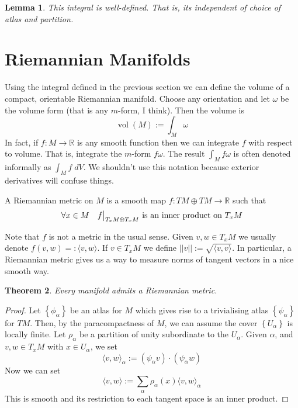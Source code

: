 \documentclass[11pt]{article}
\newcommand{\defeq}{:=}
\newcommand{\eqdef}{=:}
\newcommand{\norm}[1]{||#1||}
\DeclareMathOperator{\vol}{\mathrm{vol}}
\newcommand\restr[2]{{%
  \left.\kern-\nulldelimiterspace %
  #1 %
  \vphantom{\big|} %
  \right|_{#2} %
  }}
\newcommand{\R}{\mathbb{R}}
\newenvironment{defin}
	{\begin{mdframed}[backgroundcolor=white, roundcorner=5pt, linewidth=1pt, linecolor=RoyalBlue]
		\setlength{\parindent}{0pt}}
	{\end{mdframed}}
\newcommand{\mdf}[1]{{\color{RoyalBlue} #1}}
\newtheorem{theorem}{Theorem}[section]
\newtheorem{lemma}[theorem]{Lemma}
\begin{document}
\begin{lemma}
This integral is well-defined.
That is, its independent of choice of atlas and partition.
\end{lemma}

\section{Riemannian Manifolds}
Using the integral defined in the previous section we can define the volume of a compact, orientable Riemannian manifold.
Choose any orientation and let $\omega$ be the volume form (that is any $m$-form, I think).
Then the volume is
\[
	\vol(M)\defeq\int_M \omega
\]
In fact, if $f:M \to \R$ is any smooth function then we can integrate $f$ with respect to volume.
That is, integrate the $m$-form $f\omega$.
The result $\int_M f\omega$ is often denoted informally as $\int_M f \; dV$.
We shouldn't use this notation because exterior derivatives will confuse things.

\begin{defin}
A \mdf{Riemannian metric} on $M$ is a smooth map $f: TM \oplus TM \to \R$ such that
\[
	\forall x \in M \quad \restr{f}{T_xM\oplus T_xM}\text{ is an inner product on }T_xM
\]
\end{defin}
Note that $f$ is not a metric in the usual sense.
Given $v, w\in T_xM$ we usually denote $f(v, w)\eqdef \langle v, w\rangle$.
If $v\in T_x M$ we define $\norm{v}\defeq \sqrt{\langle v, v\rangle}$.
In particular, a Riemannian metric gives us a way to measure norms of tangent vectors in a nice smooth way.

\begin{theorem}
Every manifold admits a Riemannian metric.
\end{theorem}

\begin{proof}
Let $\left\{ \phi_\alpha\right\}$ be an atlas for $M$ which gives rise to a trivialising atlas $\left\{ \psi_\alpha\right\}$ for $TM$.
Then, by the paracompactness of $M$, we can assume the cover $\left\{ U_\alpha\right\}$ is locally finite.
Let $\rho_\alpha$ be a partition of unity subordinate to the $U_\alpha$.
Given $\alpha$, and $v, w\in T_xM$ with $x\in U_\alpha$, we set
\[
	\langle v, w\rangle_\alpha \defeq (\psi_\alpha v)\cdot (\psi_\alpha w)
\]
Now we can set
\[
	\langle v, w\rangle\defeq\sum_{\alpha}\rho_\alpha(x) \langle v, w\rangle_\alpha
\]
This is smooth and its restriction to each tangent space is an inner product.
\end{proof}
\end{document}
